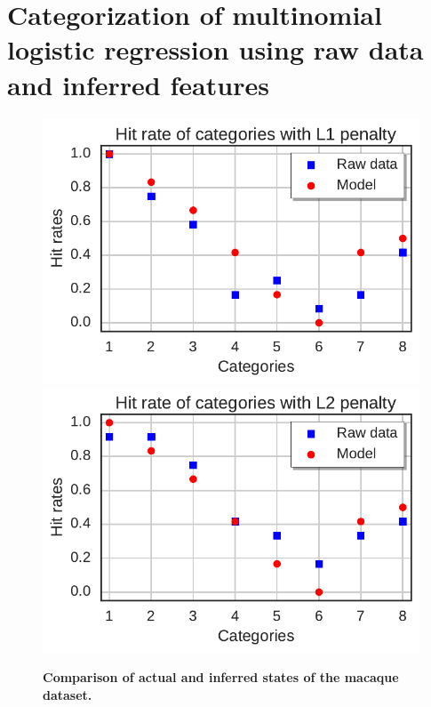 \documentclass[12pt,a4paper]{article}
\begin{document}
\section{Categorization of multinomial logistic regression using raw data and inferred features}
\begin{figure}[!h]
    \includegraphics[width=.8\linewidth]{figures/l1_hit_rate_2way}
    \includegraphics[width=.8\linewidth]{figures/l2_hit_rate_2way}
	\caption{\bf Comparison of actual and inferred states of the macaque dataset.}
	\label{fig:softmax}
\end{figure}
\end{document}
